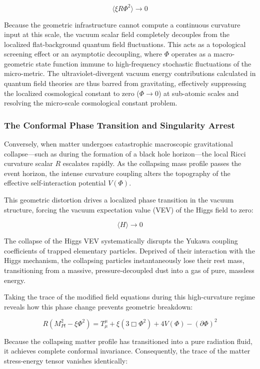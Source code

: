 \[\langle \xi R \Phi^2 \rangle \to 0\]

Because the geometric infrastructure cannot compute a continuous
curvature input at this scale, the vacuum scalar field completely
decouples from the localized flat-background quantum field fluctuations.
This acts as a topological screening effect or an asymptotic decoupling,
where \(\Phi\) operates as a macro-geometric state function immune to
high-frequency stochastic fluctuations of the micro-metric. The
ultraviolet-divergent vacuum energy contributions calculated in quantum
field theories are thus barred from gravitating, effectively suppressing
the localized cosmological constant to zero (\(\Phi \to 0\)) at
sub-atomic scales and resolving the micro-scale cosmological constant
problem.

\subsubsection{The Conformal Phase Transition and Singularity
Arrest}\label{the-conformal-phase-transition-and-singularity-arrest}

Conversely, when matter undergoes catastrophic macroscopic gravitational
collapse---such as during the formation of a black hole horizon---the
local Ricci curvature scalar \(R\) escalates rapidly. As the collapsing
mass profile passes the event horizon, the intense curvature coupling
alters the topography of the effective self-interaction potential
\(V(\Phi)\).

This geometric distortion drives a localized phase transition in the
vacuum structure, forcing the vacuum expectation value (VEV) of the
Higgs field to zero:

\[\langle H \rangle \to 0\]

The collapse of the Higgs VEV systematically disrupts the Yukawa
coupling coefficients of trapped elementary particles. Deprived of their
interaction with the Higgs mechanism, the collapsing particles
instantaneously lose their rest mass, transitioning from a massive,
pressure-decoupled dust into a gas of pure, massless energy.

Taking the trace of the modified field equations during this
high-curvature regime reveals how this phase change prevents geometric
breakdown:

\[R \left( M_{Pl}^2 - \xi \Phi^2 \right) = T^\mu_\mu + \xi \left( 3\Box \Phi^2 \right) + 4V(\Phi) - (\partial \Phi)^2\]

Because the collapsing matter profile has transitioned into a pure
radiation fluid, it achieves complete conformal invariance.
Consequently, the trace of the matter stress-energy tensor vanishes
identically:

